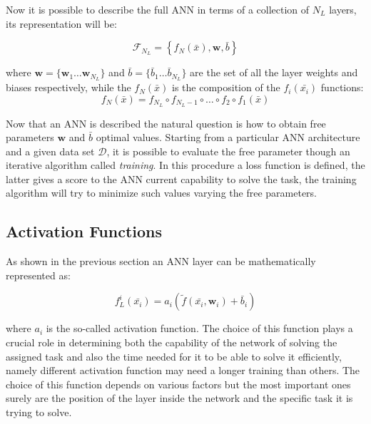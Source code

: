 \documentclass[../../main.tex]{subfiles}
\begin{document}
Now it is possible to describe the full ANN in terms of a collection of $N_L$ layers, its representation will be:

\begin{equation}
    \mathcal{F}_{N_L} = \left\{ f_N(\bar{x}), \textbf{w}, \bar{b}\right\}
\end{equation}

where $\textbf{w} = \{\textbf{w}_1 \dots \textbf{w}_{N_L}\}$ and 
$ \bar{b} = \{ \bar{b}_1 \dots  \bar{b}_{N_L}\}$ are the set of all the layer weights and biases respectively, while the $f_N(\bar{x})$ is the composition of the $f_i(\bar{x_i})$
functions:
\begin{equation}
    f_N(\bar{x}) = f_{N_L} \circ f_{N_L-1}\circ\dots\circ f_2\circ f_1 (\bar{x}) 
\end{equation}

Now that an ANN is described the natural question is how to obtain free parameters $\textbf{w}$ and $\bar{b}$ optimal values. Starting from a particular ANN architecture and a given data set $\mathcal{D}$, it is possible to evaluate the free parameter though an iterative algorithm called \textit{training}. In this procedure a loss function is defined, the latter gives a score to the ANN current capability to solve the task, the training algorithm will try to minimize such values varying the free parameters.  

\subsection{Activation Functions}
\label{sec:NN_act}

As shown in the previous section an ANN layer can be mathematically represented as:  

\begin{equation}
    f_L^i (\bar{x_i})=a_i \left( \tilde{f}(\bar{x_i}, \textbf{w}_i) + \bar{b}_i \right) 
    \label{eq:layer_math}
\end{equation}

where $a_i$ is the so-called activation function. The choice of this function plays a crucial role in determining both the capability of the network of solving the assigned task and also  the time needed for it to be able to solve it efficiently, namely different activation function may need a longer training than others. The choice of this function depends on various factors but the most important ones surely are the position of the layer inside the network and the specific task it is trying to solve.
\end{document}

